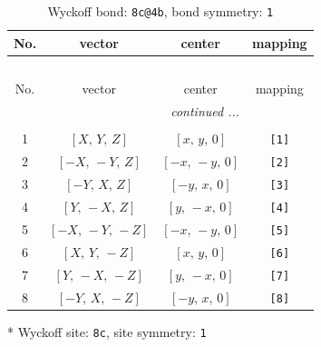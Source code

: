 \documentclass[fleqn,8pt]{jsarticle}
\begin{document}
\renewcommand{\arraystretch}{1.2}
\begin{longtable}{cccc}
\caption{Wyckoff bond: {\tt 8c@4b}, bond symmetry: {\tt 1}}
 \\
 \hline \hline
No. & vector & center & mapping \\ \hline \endfirsthead

\multicolumn{3}{l}{\tablename\ \thetable{}} \\
 \hline \hline
No. & vector & center & mapping \\ \hline \endhead

 \hline \hline
\multicolumn{3}{r}{\footnotesize\it continued ...} \\ \endfoot

 \hline \hline
\multicolumn{3}{r}{} \\ \endlastfoot

1 & $\left[ X,\, Y,\, Z \right]$ & $\left[ x,\, y,\, 0 \right]$ & {\tt [1]} \\ \hline
2 & $\left[ - X,\, - Y,\, Z \right]$ & $\left[ - x,\, - y,\, 0 \right]$ & {\tt [2]} \\ \hline
3 & $\left[ - Y,\, X,\, Z \right]$ & $\left[ - y,\, x,\, 0 \right]$ & {\tt [3]} \\ \hline
4 & $\left[ Y,\, - X,\, Z \right]$ & $\left[ y,\, - x,\, 0 \right]$ & {\tt [4]} \\ \hline
5 & $\left[ - X,\, - Y,\, - Z \right]$ & $\left[ - x,\, - y,\, 0 \right]$ & {\tt [5]} \\ \hline
6 & $\left[ X,\, Y,\, - Z \right]$ & $\left[ x,\, y,\, 0 \right]$ & {\tt [6]} \\ \hline
7 & $\left[ Y,\, - X,\, - Z \right]$ & $\left[ y,\, - x,\, 0 \right]$ & {\tt [7]} \\ \hline
8 & $\left[ - Y,\, X,\, - Z \right]$ & $\left[ - y,\, x,\, 0 \right]$ & {\tt [8]} \\
\end{longtable}
* Wyckoff site: {\tt 8c}, site symmetry: {\tt 1}
\renewcommand{\arraystretch}{1.2}
\end{document}
